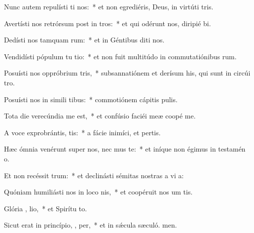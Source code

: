 \item Nunc autem repulísti  ti nos:~* et non egrediéris, Deus, in virtúti tris.
\item Avertísti nos retrórsum post in tros:~* et qui odérunt nos, diripié bi.
\item Dedísti nos tamquam  rum:~* et in Géntibus diti nos.
\item Vendidísti pópulum tu  tio:~* et non fuit multitúdo in commutatiónibus rum.
\item Posuísti nos oppróbrium  tris,~* subsannatiónem et derísum his, qui sunt in circúi tro.
\item Posuísti nos in simili tibus:~* commotiónem cápitis  pulis.
\item Tota die verecúndia me   est,~* et confúsio faciéi meæ coopé me.
\item A voce exprobrántis,  tis:~* a fácie inimíci, et pertis.
\item Hæc ómnia venérunt super nos, nec  mus te:~* et iníque non égimus in testamén o.
\item Et non recéssit   trum:~* et declinásti sémitas nostras a vi a:
\item Quóniam humiliásti nos in loco nis,~* et coopéruit nos um tis.
\item Glória ,  lio,~* et Spirítu to.
\item Sicut erat in princípio,  ,  per,~* et in sǽcula sæculó. men.
